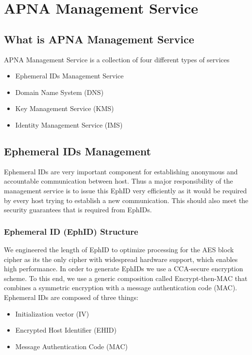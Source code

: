 
\chapter{APNA Management Service} %

\label{apnams} %

\section{What is APNA Management Service}
APNA Management Service is a collection of four different types of services

\begin{itemize}
    \item Ephemeral IDs Management Service
    \item Domain Name System (DNS)
    \item Key Management Service (KMS)
    \item Identity Management Service (IMS)
\end{itemize}

\section{Ephemeral IDs Management}
Ephemeral IDs are very important component for establishing anonymous and accountable communication between host. Thus a major responsibility of the management service is to issue this EphID very efficiently as it would be required by every host trying to establish a new communication. This should also meet the security guarantees that is required from EphIDs.

\subsection{Ephemeral ID (EphID) Structure}
We engineered the length of EphID to optimize processing for the AES block cipher as its the only cipher with widespread hardware support, which enables high performance. In order to generate EphIDs we use a CCA-secure encryption scheme. To this end, we use a generic composition called Encrypt-then-MAC that combines a symmetric encryption with a message authentication code (MAC).
Ephemeral IDs are composed of three things:
\begin{itemize}
    \item Initialization vector (IV)
    \item Encrypted Host Identifier (EHID)
    \item Message Authentication Code (MAC)
\end{itemize}


